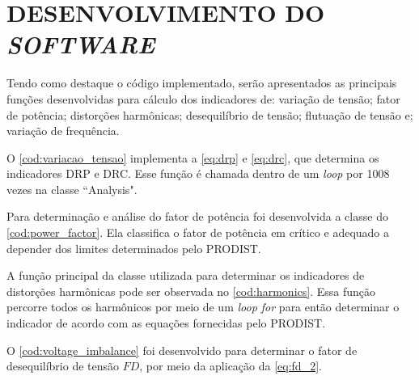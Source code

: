 \chapter{DESENVOLVIMENTO DO \textit{SOFTWARE}}

Tendo como destaque o código implementado, serão apresentados as principais funções desenvolvidas para cálculo dos indicadores de: variação de tensão; fator de potência; distorções harmônicas; desequilíbrio de tensão; flutuação de tensão e; variação de frequência.

O \autoref{cod:variacao_tensao} implementa a \autoref{eq:drp} e \autoref{eq:drc}, que determina os indicadores DRP e DRC. Esse função é chamada dentro de um \textit{loop} por 1008 vezes na classe ``Analysis".

\begin{codigo}
\end{codigo}


Para determinação e análise do fator de potência foi desenvolvida a classe do \autoref{cod:power_factor}. Ela classifica o fator de potência em crítico e adequado a depender dos limites determinados pelo PRODIST.

\begin{codigo}
\end{codigo}

A função principal da classe utilizada para determinar os indicadores de distorções harmônicas pode ser observada no \autoref{cod:harmonics}. Essa função percorre todos os harmônicos por meio de um \textit{loop for} para então determinar o indicador de acordo com as equações fornecidas pelo PRODIST.

O \autoref{cod:voltage_imbalance} foi desenvolvido para determinar o fator de desequilíbrio de tensão $FD$, por meio da aplicação da \autoref{eq:fd_2}.

\begin{codigo}
\end{codigo}

\begin{codigo}
\end{codigo}

